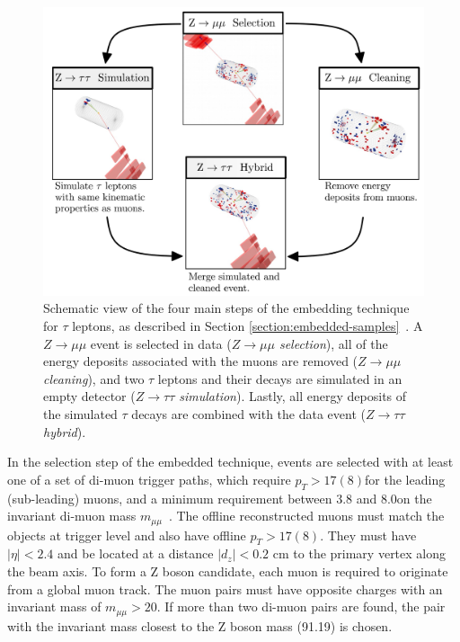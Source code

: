 \begin{figure}[ht]
    \centering
    \includegraphics[width=13cm]{figures/ch-4-datasets-monte-carlo/embedded_schematic}
    \caption[Schematic view of the four main steps of the embedding technique for $\tau$ leptons.]{Schematic view of the four main steps of the embedding technique for $\tau$ leptons, as described in Section \ref{section:embedded-samples}~\cite{CMS-TAU-18-001}. A $Z \rightarrow \mu\mu$ event is selected in data (\textit{$Z\rightarrow \mu\mu$ selection}), all of the energy deposits associated with the muons are removed (\textit{$Z \rightarrow \mu\mu$ cleaning}), and two $\tau$ leptons and their decays are simulated in an empty detector (\textit{$Z \rightarrow \tau\tau$ simulation}). Lastly, all energy deposits of the simulated $\tau$ decays are combined with the data event (\textit{$Z \rightarrow \tau\tau$ hybrid}).} 
    \label{fig:embedded-schematic}
\end{figure}

In the selection step of the embedded technique, events are selected with at least one of a set of di-muon trigger paths, which require $p_{T} > 17 (8)$\GeV for the leading (sub-leading) muons, and a minimum requirement between 3.8 and 8.0\GeV on the invariant di-muon mass $m_{\mu\mu}$~\cite{CMS-TAU-18-001}. The offline reconstructed muons must match the objects at trigger level and also have offline $p_{T} > 17 (8)$\GeV. They must have $|\eta| < 2.4$ and be located at a  distance $|d_z| < 0.2$ cm to the primary vertex along the beam axis. To form a Z boson candidate, each muon is required to originate from a global muon track. The muon pairs must have opposite charges with an invariant mass of $m_{\mu\mu} > 20$\GeV. If more than two di-muon pairs are found, the pair with the invariant mass closest to the Z boson mass (91.19\GeV) is chosen. 

